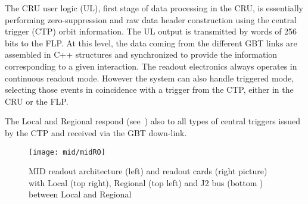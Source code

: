 The CRU user logic (UL), first stage of data processing in the CRU, is essentially performing zero-suppression and raw data header construction using the central trigger (CTP) orbit information. 
The UL output is transmitted by words of 256 bits to the FLP. At this level, the data coming from the different GBT links are assembled in C++ structures and synchronized to provide the information 
corresponding to a given interaction. The readout electronics always operates in continuous readout mode. However the system can also handle triggered mode, selecting those events in coincidence with a trigger from the CTP, either 
in the CRU or the FLP.

The Local and Regional respond (see~\cite{mid:ROweb}) also to all types of central triggers issued by the CTP and received via the GBT down-link. 




\begin{figure}
\centering 
\texttt{[image: mid/midRO]}
\caption{MID readout architecture (left) and readout cards (right picture) with Local (top right), Regional (top left) and J2 bus (bottom ) between Local and Regional}
\label{midRO}
\end{figure}





